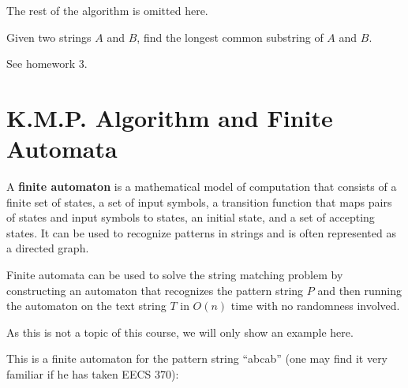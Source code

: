 The rest of the algorithm is omitted here.

\begin{question}
	Given two strings $A$ and $B$, find the longest common substring of $A$ and $B$.
\end{question}

See homework 3.

\chapter {K.M.P. Algorithm and Finite Automata}

\begin{definition}
	A \textbf{finite automaton} is a mathematical model of computation that consists of a finite set of states, a set of input symbols, a transition function that maps pairs of states and input symbols to states, an initial state, and a set of accepting states. It can be used to recognize patterns in strings and is often represented as a directed graph.
\end{definition}

Finite automata can be used to solve the string matching problem by constructing an automaton that recognizes the pattern string $P$ and then running the automaton on the text string $T$ in $O(n)$ time with no randomness involved.

As this is not a topic of this course, we will only show an example here.

This is a finite automaton for the pattern string ``abcab'' (one may find it very familiar if he has taken EECS 370):


